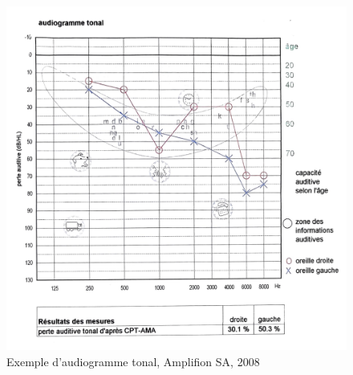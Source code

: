 \begin{figure}[h]
	\centering
	\includegraphics[width=0.7\linewidth]{images/graphiques/exempleaudiogramme.png}
	\caption{Exemple d'audiogramme tonal, Amplifion SA, 2008}
\label{audiogramme}
\end{figure}

